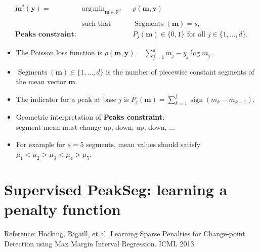 \documentclass[legalpaper]{article}
\newcommand{\RR}{\mathbb R}
\DeclareMathOperator*{\sign}{sign}
\DeclareMathOperator*{\argmin}{arg\,min}
\DeclareMathOperator*{\Segments}{Segments}
\begin{document}
\begin{equation*}
  \label{argmin:constrained}
  \begin{aligned}
    \mathbf{\tilde m}^s(\mathbf y)  =\ 
    &\argmin_{\mathbf m\in\RR^{d}} && 
    \rho
    (\mathbf m, \mathbf y) \\
    \\
    &\text{such that} && \Segments(\mathbf m)=s,\\
    \textbf{Peaks constraint:}
    & && P_j(\mathbf m) \in\{0, 1\} \text{ for all } j\in\{1, \dots, d\}.
  \end{aligned}
\end{equation*}
\begin{itemize}
\item The Poisson loss function is $\rho(\mathbf m, \mathbf y)=
  \sum_{j=1}^d m_j - y_j \log m_j$.
\item$\Segments(\mathbf m)\in\{1, \dots, d\}$ is the number of
  piecewise constant segments of the mean vector $\mathbf m$.
\item The indicator for a peak at base $j$ is 
$
  P_j(\mathbf m) = \sum_{k=1}^j \sign( m_k - m_{k-1} ).
$
\item Geometric interpretation of \textbf{Peaks constraint}:\\
  segment mean must change up, down, up, down, ...
\item For example for $s=5$ segments, mean values should satisfy\\
  $\mu_1 < \mu_2 > \mu_3 < \mu_4 > \mu_5$.
\end{itemize}

\newpage

\section*{Supervised PeakSeg: learning a penalty function}
Reference: Hocking, Rigaill, et al. Learning Sparse Penalties for
Change-point Detection using Max Margin Interval Regression. ICML
2013.
\end{document}

